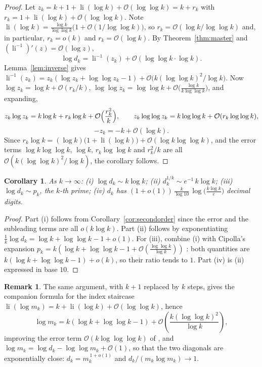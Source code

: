 \documentclass[11pt,a4paper]{article}
\theoremstyle{plain}
\newtheorem{corollary}[theorem]{Corollary}
\theoremstyle{definition}
\newtheorem{remark}[theorem]{Remark}
\newcommand{\li}{\operatorname{li}}
\begin{document}
\begin{proof}
Let $z_k=k+1+\li(\log k)+\mathcal{O}(\log\log k)=k+r_k$ with
$r_k=1+\li(\log k)+\mathcal{O}(\log\log k)$. Note
$\li(\log k)=\frac{\log k}{\log\log k}\bigl(1+\mathcal{O}(1/\log\log
k)\bigr)$, so $r_k=\mathcal{O}(\log k/\log\log k)$ and, in particular,
$r_k=o(k)$ and $r_k=\mathcal{O}(\log k)$. By Theorem~\ref{thm:master} and
$(\li^{-1})'(z)=\mathcal{O}(\log z)$,
\[
  \log d_k=\li^{-1}(z_k)+\mathcal{O}(\log\log k\cdot\log k).
\]
Lemma~\ref{lem:inverse} gives
$\li^{-1}(z_k)=z_k(\log z_k+\log\log z_k-1)
+\mathcal{O}\bigl(k(\log\log k)^2/\log k\bigr)$. Now
$\log z_k=\log k+\mathcal{O}(r_k/k)$, $\log\log z_k=\log\log
k+\mathcal{O}\bigl(\frac{\log k}{k\log\log k}\bigr)$, and expanding,
\[
  z_k\log z_k=k\log k+r_k\log k+\mathcal{O}\Bigl(\frac{r_k^2}{k}\Bigr),
  \qquad
  z_k\log\log z_k=k\log\log k+\mathcal{O}(r_k\log\log k),
\]
\[
  -z_k=-k+\mathcal{O}(\log k).
\]
Since $r_k\log k=(\log k)\bigl(1+\li(\log k)\bigr)
+\mathcal{O}(\log k\log\log k)$, and the error terms
$\log k\log\log k$, $\log k$, $r_k\log\log k$ and $r_k^2/k$ are all
$\mathcal{O}(k(\log\log k)^2/\log k)$, the corollary follows.
\end{proof}

\begin{corollary}\label{cor:main}
As $k\to\infty$:
\emph{(i)} $\displaystyle \log d_k\sim k\log k$;
\emph{(ii)} $\displaystyle d_k^{1/k}\sim e^{-1}\,k\log k$;
\emph{(iii)} $\displaystyle \log d_k\sim p_k$, the $k$-th prime;
\emph{(iv)} $d_k$ has $(1+o(1))\,\frac{k}{\log 10}\,
\log\!\bigl(\frac{k\log k}{e}\bigr)$ decimal digits.
\end{corollary}

\begin{proof}
Part (i) follows from Corollary~\ref{cor:secondorder} since the error and
the subleading terms are all $o(k\log k)$. Part (ii) follows by exponentiating
$\frac1k\log d_k=\log k+\log\log k-1+o(1)$. For (iii), combine (i) with
Cipolla's expansion $p_k=k(\log k+\log\log k-1+
\mathcal{O}(\frac{\log\log k}{\log k}))$ \cite{Cipolla}: both quantities are
$k(\log k+\log\log k-1)+o(k)$, so their ratio tends to $1$. Part (iv) is
(ii) expressed in base $10$.
\end{proof}

\begin{remark}\label{rem:mk}
The same argument, with $k+1$ replaced by $k$ steps, gives the companion
formula for the index staircase
$\li(\log m_k)=k+\li(\log k)+\mathcal{O}(\log\log k)$, hence
\[
  \log m_k=k(\log k+\log\log k-1)+\mathcal{O}\!\left(
  \frac{k(\log\log k)^2}{\log k}\right),
\]
improving the error term $\mathcal{O}(k\log\log\log k)$ of
\cite[Theorem~9(2)]{MiskaTothZmija}, and
$\log m_k=\log d_k-\log\log m_k+\mathcal{O}(1)$, so that the two diagonals
are exponentially close: $d_k=m_k^{\,1+o(1)}$ and
$d_k/(m_k\log m_k)\to1$.
\end{remark}
\end{document}
